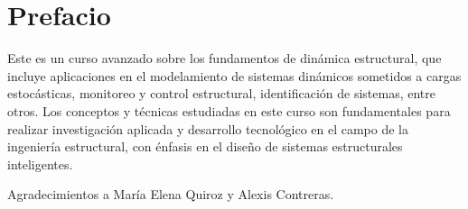 \chapter*{Prefacio}

Este es un curso avanzado sobre los fundamentos de dinámica estructural, que incluye aplicaciones en el modelamiento de sistemas dinámicos sometidos a cargas estocásticas, monitoreo y control estructural, identificación de sistemas, entre otros. Los conceptos y técnicas estudiadas en este curso son fundamentales para realizar investigación aplicada y desarrollo tecnológico en el campo de la ingeniería estructural, con énfasis en el diseño de sistemas estructurales inteligentes.

Agradecimientos a María Elena Quiroz y Alexis Contreras.